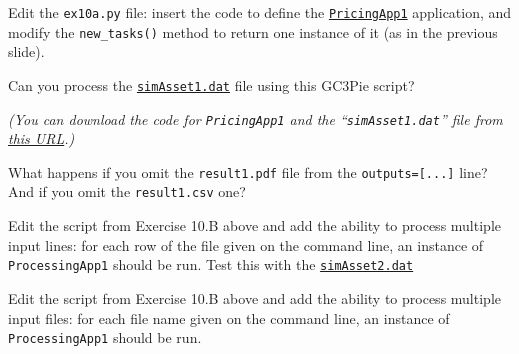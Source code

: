 \documentclass[english,serif,mathserif,xcolor=pdftex,dvipsnames,table]{beamer}
\begin{document}
\begin{frame}[fragile]
  \small

  \begin{exercise*}[10.B]

    \+
    Edit the \texttt{ex10a.py} file: insert the code to define the
    \href{https://raw.githubusercontent.com/riccardomurri/python-for-science-intro/master/downloads/pricingapp1.py}{\texttt{PricingApp1}}
    application, and modify the \texttt{new\_tasks()} method to return
    one instance of it (as in the previous slide).

    \+
    Can you process the \href{https://raw.githubusercontent.com/riccardomurri/python-for-science-intro/master/fig/simAsset1.dat}{\texttt{simAsset1.dat}} file using this GC3Pie script?

    \+ \footnotesize
    {\em (You can download the code for \texttt{PricingApp1} and the ``\texttt{simAsset1.dat}'' file from
   \href{https://raw.githubusercontent.com/riccardomurri/python-for-science-intro/master/download/}{this
      URL}.)}
  \end{exercise*}

  \+
  \begin{exercise*}[10.C]
    What happens if you omit the \texttt{result1.pdf} file from the
    \texttt{outputs=[...]} line?  And if you omit the \texttt{result1.csv} one?
  \end{exercise*}
\end{frame}


\begin{frame}[fragile]
  \small

  \begin{exercise*}[10.D]

    Edit the script from Exercise 10.B above and add the ability to process
    multiple input lines: for each row of the file given on the command line, an
    instance of \texttt{ProcessingApp1} should be run. Test this with the
    \href{https://raw.githubusercontent.com/riccardomurri/python-for-science-intro/master/fig/simAsset2.dat}{\texttt{simAsset2.dat}}
  \end{exercise*}

  \+
  \begin{exercise*}[10.E]
    Edit the script from Exercise 10.B above and add the ability to
    process multiple input files: for each file name given on the command
    line, an instance of \texttt{ProcessingApp1} should be run.
  \end{exercise*}
\end{frame}
\end{document}

